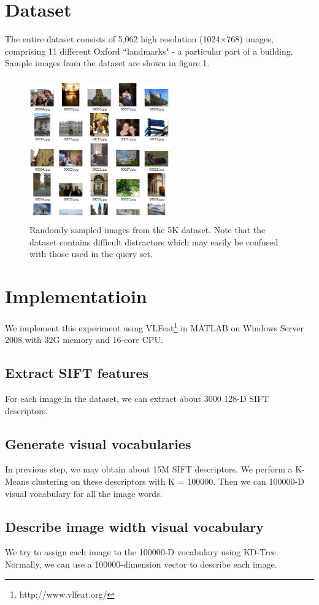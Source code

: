 \documentclass{acm_proc_article-sp}
\begin{document}
\section{Dataset}
The entire dataset consists of 5,062 high resolution (1024$\times$768) images, comprising 11 different Oxford ``landmarks" - a particular part of a building. Sample images from the dataset are shown in figure 1.
\begin{figure}
\centering
\includegraphics[height=6.18cm ,width=6cm,angle=0]{dataset.png}
\caption{Randomly sampled images from the 5K dataset. Note
that the dataset contains difficult distractors which may easily be
confused with those used in the query set.}
\end{figure}
\section{Implementatioin}
We implement this experiment using VLFeat\footnote{http://www.vlfeat.org/} in MATLAB on Windows Server 2008 with 32G memory and 16-core CPU.
\subsection{Extract SIFT features}
For each image in the dataset, we can extract about 3000 128-D SIFT descriptors.
\subsection{Generate visual vocabularies}
In previous step, we may obtain about 15M SIFT descriptors. We perform a K-Means clustering on these descriptors with K = 100000. Then we can 100000-D visual vocabulary for all the image words.
\subsection{Describe image width visual vocabulary}
We try to assign each image to the 100000-D vocabulary using KD-Tree. Normally, we can use a 100000-dimension vector to describe each image.
\end{document}
